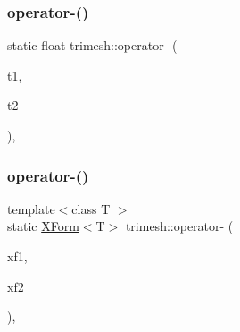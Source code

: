 \mbox{\label{namespacetrimesh_ae09626ee94207fe21f07ab66c96bd437}} 
\subsubsection{\texorpdfstring{operator-\/()}{operator-()}\hspace{0.1cm}{\footnotesize\ttfamily [1/4]}}
{\footnotesize\ttfamily static float trimesh\+::operator-\/ (\begin{DoxyParamCaption}\item[{const \hyperlink{namespacetrimesh_afc360812cb91ca27ac234664b59fe356}{timestamp} \&}]{t1,  }\item[{const \hyperlink{namespacetrimesh_afc360812cb91ca27ac234664b59fe356}{timestamp} \&}]{t2 }\end{DoxyParamCaption})\hspace{0.3cm}{\ttfamily [inline]}, {\ttfamily [static]}}

\mbox{\label{namespacetrimesh_acc3ec38b95c8dcc3d5d20f3226ca1b6b}} 
\subsubsection{\texorpdfstring{operator-\/()}{operator-()}\hspace{0.1cm}{\footnotesize\ttfamily [2/4]}}
{\footnotesize\ttfamily template$<$class T $>$ \\
static \hyperlink{classtrimesh_1_1XForm}{X\+Form}$<$T$>$ trimesh\+::operator-\/ (\begin{DoxyParamCaption}\item[{const \hyperlink{classtrimesh_1_1XForm}{X\+Form}$<$ T $>$ \&}]{xf1,  }\item[{const \hyperlink{classtrimesh_1_1XForm}{X\+Form}$<$ T $>$ \&}]{xf2 }\end{DoxyParamCaption})\hspace{0.3cm}{\ttfamily [inline]}, {\ttfamily [static]}}

\mbox{\label{namespacetrimesh_a31d15e2f372bcbdbce1764d3bc6e27ed}} 
